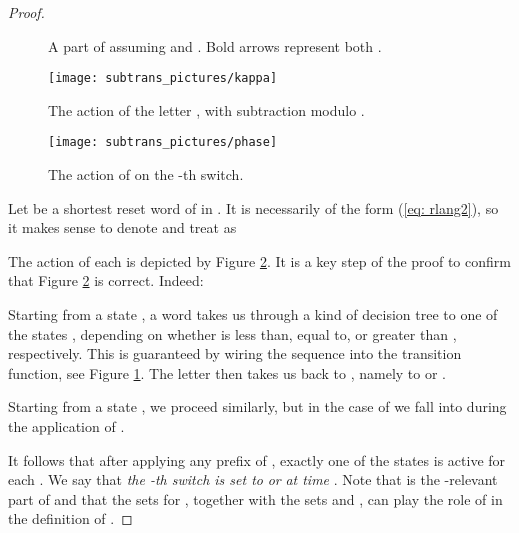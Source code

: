 \documentclass{ws-ijmpc}
\begin{document}
\begin{proof}
\begin{figure}
\caption{\label{fig: ex dec}A part of  assuming  and .
Bold arrows represent both .}
\end{figure}
 
\begin{figure}
\begin{minipage}[t]{0.45\columnwidth}\begin{center}
\texttt{[image: subtrans\_pictures/kappa]}\caption{\label{fig: kappa}The action of the letter , with subtraction
modulo .}

\par\end{center}\end{minipage}\hfill{}\begin{minipage}[t]{0.45\columnwidth}\begin{center}
\texttt{[image: subtrans\_pictures/phase]}\caption{\label{fig: phase}The action of  on the -th
switch.}

\par\end{center}\end{minipage}
\end{figure}
 

Let  be a shortest reset word of  in . It is necessarily
of the form (\ref{eq: rlang2}), so it makes sense to denote 
and treat  as

The action of each  is depicted by Figure \ref{fig: phase}.
It is a key step of the proof to confirm that Figure \ref{fig: phase}
is correct. Indeed:
\begin{itemlist}
\item Starting from a state , a word 
takes us through a kind of decision tree to one of the states ,
depending on whether  is less than, equal to, or greater than
, respectively. This is guaranteed by wiring
the sequence  into the transition function, see Figure \ref{fig: ex dec}.
The letter  then takes us back to ,
namely to  or .
\item Starting from a state , we proceed similarly,
but in the case of  we fall into 
during the application of . 
\end{itemlist}
It follows that after applying any prefix 
of , exactly one of the states 
is active for each . We say that \emph{the -th switch is set
to }\textbf{\emph{}} \emph{or } \emph{at
time }. Note that 
is the -relevant part of  and that the sets 
for , together with the sets 
and , can play
the role of  in the definition of .


\end{proof}
\end{document}
